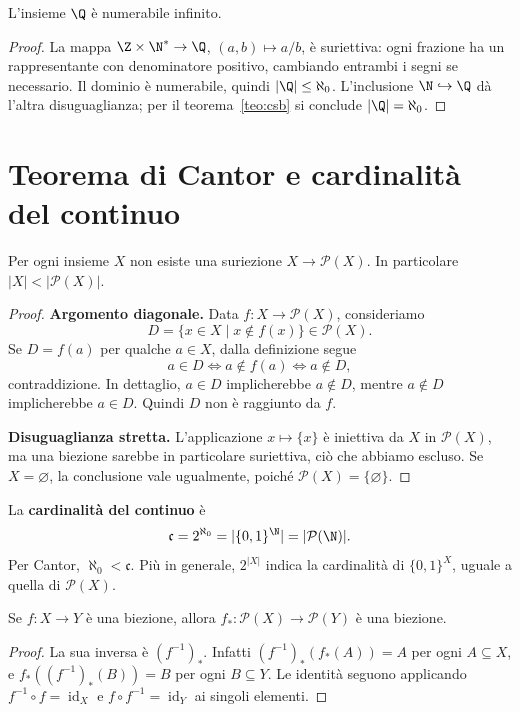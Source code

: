 \begin{corollario}
L'insieme $\Q$ è numerabile infinito.
\end{corollario}
\begin{proof}
La mappa $\Z\times\N^*\to\Q$, $(a,b)\mapsto a/b$, è suriettiva: ogni frazione ha un rappresentante con denominatore positivo, cambiando entrambi i segni se necessario. Il dominio è numerabile, quindi $|\Q|\le\aleph_0$. L'inclusione $\N\hookrightarrow\Q$ dà l'altra disuguaglianza; per il teorema~\ref{teo:csb} si conclude $|\Q|=\aleph_0$.
\end{proof}

\section{Teorema di Cantor e cardinalità del continuo}
\begin{teorema}[Cantor]\label{teo:cantor}
Per ogni insieme $X$ non esiste una suriezione $X\to\mathcal P(X)$. In particolare $|X|<|\mathcal P(X)|$.
\end{teorema}
\begin{proof}
\textbf{Argomento diagonale.} Data $f:X\to\mathcal P(X)$, consideriamo
\[
D=\{x\in X\mid x\notin f(x)\}\in\mathcal P(X).
\]
Se $D=f(a)$ per qualche $a\in X$, dalla definizione segue
\[
a\in D\iff a\notin f(a)\iff a\notin D,
\]
contraddizione. In dettaglio, $a\in D$ implicherebbe $a\notin D$, mentre $a\notin D$ implicherebbe $a\in D$. Quindi $D$ non è raggiunto da $f$.

\textbf{Disuguaglianza stretta.} L'applicazione $x\mapsto\{x\}$ è iniettiva da $X$ in $\mathcal P(X)$, ma una biezione sarebbe in particolare suriettiva, ciò che abbiamo escluso. Se $X=\varnothing$, la conclusione vale ugualmente, poiché $\mathcal P(X)=\{\varnothing\}$.
\end{proof}

\begin{definizione}
La \textbf{cardinalità del continuo} è
\[
\mathfrak c=2^{\aleph_0}=|\{0,1\}^{\N}|=|\mathcal P(\N)|.
\]
Per Cantor, $\aleph_0<\mathfrak c$. Più in generale, $2^{|X|}$ indica la cardinalità di $\{0,1\}^X$, uguale a quella di $\mathcal P(X)$.
\end{definizione}

\begin{proposizione}
Se $f:X\to Y$ è una biezione, allora $f_*:\mathcal P(X)\to\mathcal P(Y)$ è una biezione.
\end{proposizione}
\begin{proof}
La sua inversa è $(f^{-1})_*$. Infatti $(f^{-1})_*(f_*(A))=A$ per ogni $A\subseteq X$, e $f_*((f^{-1})_*(B))=B$ per ogni $B\subseteq Y$. Le identità seguono applicando $f^{-1}\circ f=\operatorname{id}_X$ e $f\circ f^{-1}=\operatorname{id}_Y$ ai singoli elementi.
\end{proof}

